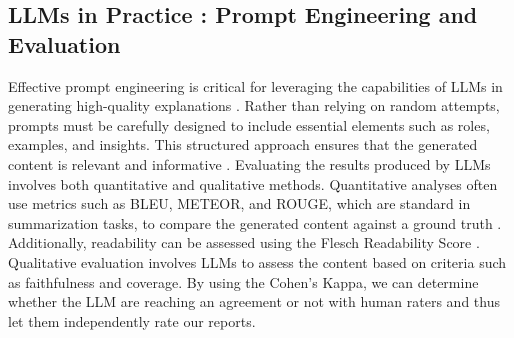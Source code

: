 \documentclass[preprint,12pt]{elsarticle}
\begin{document}
\subsection{LLMs in Practice : Prompt Engineering and Evaluation}

Effective prompt engineering is critical for leveraging the capabilities of LLMs in generating high-quality explanations \cite{Chen2024}. Rather than relying on random attempts, prompts must be carefully designed to include essential elements such as roles, examples, and insights. This structured approach ensures that the generated content is relevant and informative \cite{White2023}. Evaluating the results produced by LLMs involves both quantitative and qualitative methods. Quantitative analyses often use metrics such as BLEU, METEOR, and ROUGE, which are standard in summarization tasks, to compare the generated content against a ground truth \cite{Papineni2002, Lin2004}. Additionally, readability can be assessed using the Flesch Readability Score \cite{Cooperman2024}. Qualitative evaluation involves LLMs to assess the content based on criteria such as faithfulness and coverage.  By using the Cohen's Kappa, we can determine whether the LLM are reaching an agreement or not with human raters and thus let them independently rate our reports. \\
\end{document}
